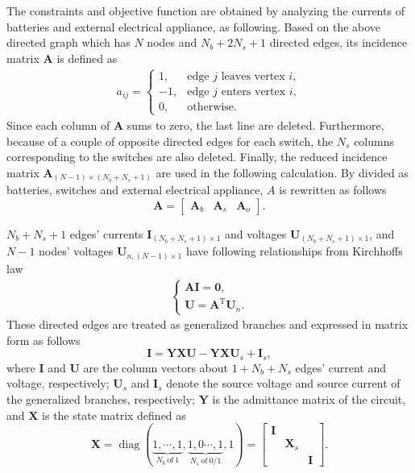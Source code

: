 \documentclass{article}
\DeclareMathOperator{\diag}{diag}
\def\T{\mathrm{T}}
\begin{document}
The constraints and objective function are obtained by analyzing the currents of batteries and external electrical appliance, as following.
Based on the above directed graph which has $N$ nodes and $N_b+2N_s+1$ directed edges, its incidence matrix $\bm{A}$ is defined as
\begin{align}\label{eq:A}
    a_{ij}=
    \begin{cases}
        1,  & \text{edge  $j$ leaves vertex $i$},\\
        -1, & \text{edge $j$ enters vertex $i$},\\
        0,  & \text{otherwise}.
    \end{cases}
\end{align}
Since each column of $\bm{A}$ sums to zero, the last line are deleted.
Furthermore, because of a couple of opposite directed edges for each switch, the $N_s$ columns corresponding to the switches are also deleted.
Finally, the reduced incidence matrix $\bm{A}_{(N-1)\times(N_b+N_s+1)}$ are used in the following calculation.
By divided as batteries, switches and external electrical appliance, $A$ is rewritten as follows
\begin{equation}
    \bm{A} =
    \begin{bmatrix}
        \bm{A}_b & \bm{A}_s & \bm{A}_o
    \end{bmatrix}.
\end{equation}


$N_b+N_s+1$ edges' currents $\bm{I}_{(N_b+N_s+1)\times 1}$ and voltages $\bm{U}_{(N_b+N_s+1)\times 1}$, and $N-1$ nodes' voltages $\bm{U}_{n, (N-1)\times 1}$ have following relationships from Kirchhoffs law
\begin{align}\label{eq:Kirchhoffs_law}
    \begin{cases}
        \bm{A} \bm{I} = \bm{0}, \\
        \bm{U}        = \bm{A}^\T \bm{U}_n.
    \end{cases}
\end{align}
These directed edges are treated as generalized branches and expressed in matrix form as follows
\begin{equation}\label{eq:generalized_branches}
    \bm{I} = \bm{Y}\bm{X} \bm{U} - \bm{Y}\bm{X} \bm{U}_s +\bm{I}_s,
\end{equation}
where $\bm{I}$ and $\bm{U}$ are the column vectors about $1+N_b+N_s$ edges' current and voltage, respectively;
$\bm{U}_s$ and $\bm{I}_s$ denote the source voltage and source current of the generalized branches, respectively;
$\bm{Y}$ is the admittance matrix of the circuit, and $\bm{X}$ is the state matrix defined as
\begin{equation}\label{eq:X}
    \bm{X} = \diag(
    \underbrace{1, \cdots, 1}_{N_b~\text{of}~1},
    \underbrace{1, 0 \cdots, 1}_{N_s~\text{of}~0/1},
    1)
    =\begin{bmatrix}
        \bm{I} & & \\
        & \bm{X}_s &\\
        & &\bm{I}
    \end{bmatrix}.
\end{equation}
\end{document}
